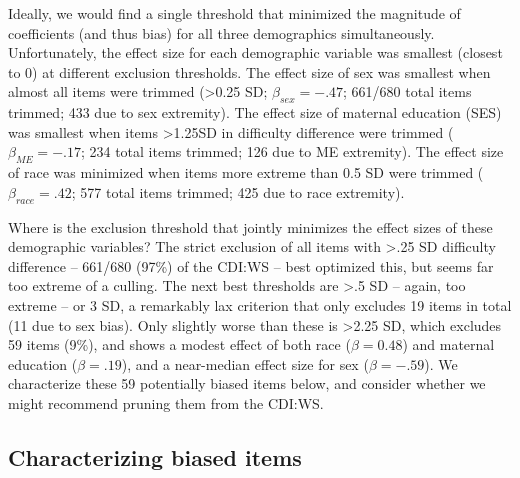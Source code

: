 \documentclass[10pt, letterpaper]{article}
\begin{document}
Ideally, we would find a single threshold that minimized the magnitude
of coefficients (and thus bias) for all three demographics
simultaneously. Unfortunately, the effect size for each demographic
variable was smallest (closest to 0) at different exclusion thresholds.
The effect size of sex was smallest when almost all items were trimmed
(\textgreater0.25 SD; \(\beta_{sex} = -.47\); 661/680 total items
trimmed; 433 due to sex extremity). The effect size of maternal
education (SES) was smallest when items \textgreater1.25SD in difficulty
difference were trimmed (\(\beta_{ME} = -.17\); 234 total items trimmed;
126 due to ME extremity). The effect size of race was minimized when
items more extreme than 0.5 SD were trimmed (\(\beta_{race} = .42\); 577
total items trimmed; 425 due to race extremity).

Where is the exclusion threshold that jointly minimizes the effect sizes
of these demographic variables? The strict exclusion of all items with
\textgreater.25 SD difficulty difference -- 661/680 (97\%) of the CDI:WS
-- best optimized this, but seems far too extreme of a culling. The next
best thresholds are \textgreater.5 SD -- again, too extreme -- or 3 SD,
a remarkably lax criterion that only excludes 19 items in total (11 due
to sex bias). Only slightly worse than these is \textgreater2.25 SD,
which excludes 59 items (9\%), and shows a modest effect of both race
(\(\beta=0.48\)) and maternal education (\(\beta=.19\)), and a
near-median effect size for sex (\(\beta=-.59\)). We characterize these
59 potentially biased items below, and consider whether we might
recommend pruning them from the CDI:WS.

\hypertarget{characterizing-biased-items}{%
\subsection{Characterizing biased
items}\label{characterizing-biased-items}}
\end{document}
